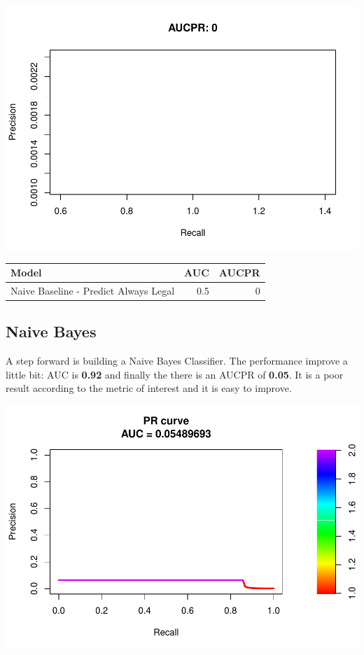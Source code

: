 \documentclass[]{article}
\begin{document}
\begin{center}\includegraphics{Credit_Card_Fraud_Detection_Project_Report_files/figure-latex/unnamed-chunk-16-2} \end{center}

\begin{table}[H]
\centering\begingroup\fontsize{10}{12}\selectfont

\begin{tabular}{l|r|r}
\hline
Model & AUC & AUCPR\\
\hline
Naive Baseline - Predict Always Legal & 0.5 & 0\\
\hline
\end{tabular}
\endgroup{}
\end{table}
\newpage

\hypertarget{naive-bayes}{%
\subsection{Naive Bayes}\label{naive-bayes}}

A step forward is building a Naive Bayes Classifier. The performance
improve a little bit: AUC is \textbf{0.92} and finally the there is an
AUCPR of \textbf{0.05}. It is a poor result according to the metric of
interest and it is easy to improve.

\begin{center}\includegraphics{Credit_Card_Fraud_Detection_Project_Report_files/figure-latex/unnamed-chunk-17-1} \end{center}
\end{document}
